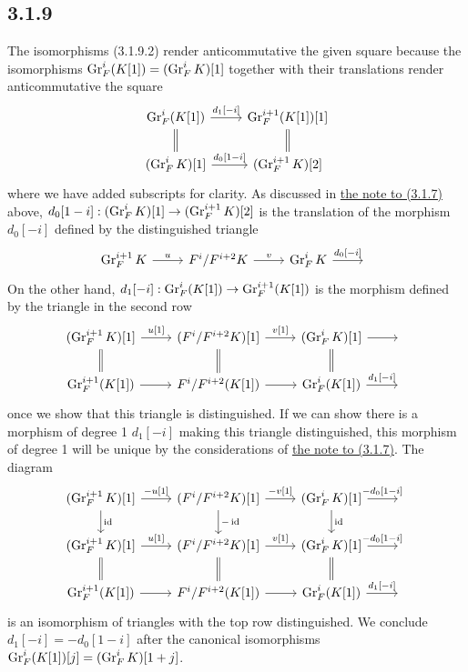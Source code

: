 \documentclass[deligne.tex]{subfiles}
\begin{document}
\subsection*{3.1.9}
The isomorphisms (3.1.9.2) render anticommutative the given square because
the isomorphisms $\operatorname{Gr}^i_F(K[1])=(\operatorname{Gr}^i_FK)[1]$ together with their
translations render anticommutative the square
\begin{equation*}\begin{tikzcd}
	\Gr^i_F(K[1])\arrow[d,equals]\arrow[r,"{d_1[-i]}"]
	&\Gr^{i+1}_F(K[1])[1]\arrow[d,equals] \\
	(\Gr^i_FK)[1]\arrow[r,"{d_0[1-i]}"]& (\Gr^{i+1}_FK)[2]
\end{tikzcd}\end{equation*}
where we have added subscripts for clarity.
As discussed in \hyperref[BBD:3.1.7]{the note to (3.1.7)} above,
$d_0[1-i]:(\operatorname{Gr}^i_FK)[1]\rightarrow(\operatorname{Gr}_F^{i+1}K)[2]$ is the translation of the
morphism $d_0[-i]$ defined by the distinguished triangle
\begin{equation*}\begin{tikzcd}
	\Gr^{i+1}_FK\arrow[r,"u"]&F^i/F^{i+2}K\arrow[r,"v"]
	&\Gr^i_FK\arrow[r,"{d_0[-i]}"]&\;
\end{tikzcd}\end{equation*}
On the other hand, $d_1[-i]:\operatorname{Gr}_F^i(K[1])\rightarrow\operatorname{Gr}_F^{i+1}(K[1])$ is the 
morphism defined by the triangle in the second row
\begin{equation*}\begin{tikzcd}
	(\Gr^{i+1}_FK)[1]\arrow[r,"{u[1]}"]\arrow[d,equals]
	&(F^i/F^{i+2}K)[1]\arrow[r,"{v[1]}"]\arrow[d,equals]
	&(\Gr_F^iK)[1]\arrow[r]\arrow[d,equals]&\; \\
	\Gr^{i+1}_F(K[1])\arrow[r]&F^i/F^{i+2}(K[1])\arrow[r]
	&\Gr_F^i(K[1])\arrow[r,"{d_1[-i]}"]&\;
\end{tikzcd}\end{equation*}
once we show that this triangle is distinguished.
If we can show there is a morphism of degree 1 $d_1[-i]$ making this
triangle distinguished, this morphism of degree 1 will be unique by the 
considerations of \hyperref[BBD:3.1.7]{the note to (3.1.7)}.
The diagram
\begin{equation*}\begin{tikzcd}
	(\Gr^{i+1}_FK)[1]\arrow[r,"{-u[1]}"]\arrow[d,"\id"]
	&(F^i/F^{i+2}K)[1]\arrow[r,"{-v[1]}"]\arrow[d,"-\id"]
	&(\Gr_F^iK)[1]\arrow[r,"{-d_0[1-i]}"]\arrow[d,"\id"]&\; \\
	(\Gr^{i+1}_FK)[1]\arrow[r,"{u[1]}"]\arrow[d,equals]
	&(F^i/F^{i+2}K)[1]\arrow[r,"{v[1]}"]\arrow[d,equals]
	&(\Gr_F^iK)[1]\arrow[r,"{-d_0[1-i]}"]\arrow[d,equals]&\; \\
	\Gr^{i+1}_F(K[1])\arrow[r]&F^i/F^{i+2}(K[1])\arrow[r]
	&\Gr_F^i(K[1])\arrow[r,"{d_1[-i]}"]&\;
\end{tikzcd}\end{equation*}
is an isomorphism of triangles with the top row distinguished.
We conclude $d_1[-i]=-d_0[1-i]$ after the canonical isomorphisms
$\operatorname{Gr}^i_F(K[1])[j]=(\operatorname{Gr}_F^iK)[1+j]$.
\end{document}
